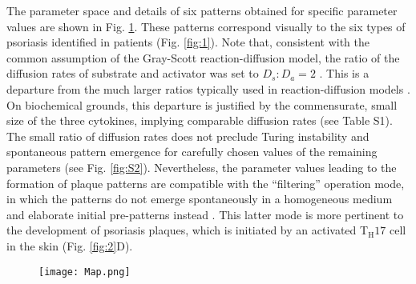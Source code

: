 The parameter space and details of six patterns obtained for specific parameter values are shown in Fig. \ref{fig:3}. These patterns correspond visually to the six types of psoriasis identified in patients (Fig. \ref{fig:1}). Note that, consistent with the common assumption of the Gray-Scott reaction-diffusion model, the ratio of the diffusion rates of substrate and activator was set to $D_s:D_a=2$ \citep{pearson1993}. This is a departure from the much larger ratios typically used in reaction-diffusion models \citep{diego2018, gierer1972, kondo2010, lengyel1991, marcon2016, vastano1987}. On biochemical grounds, this departure is justified by the commensurate, small size of the three cytokines, implying comparable diffusion rates (see Table S1). The small ratio of diffusion rates does not preclude Turing instability and spontaneous pattern emergence for carefully chosen values of the remaining parameters (see Fig. \ref{fig:S2}). Nevertheless, the  parameter values leading to the formation of plaque patterns are compatible with the ``filtering” operation mode, in which the patterns do not emerge spontaneously in a homogeneous medium and elaborate initial pre-patterns instead \citep{diego2018, lee1993, muratov2000, pearson1993}. This latter mode is more pertinent to the development of psoriasis plaques, which is initiated by an activated T$_{\text{H}}17$ cell in the skin (Fig. \ref{fig:2}D).

\begin{figure}[!htb]
	\centering
	\texttt{[image: Map.png]}
	\label{fig:3}
\end{figure}


